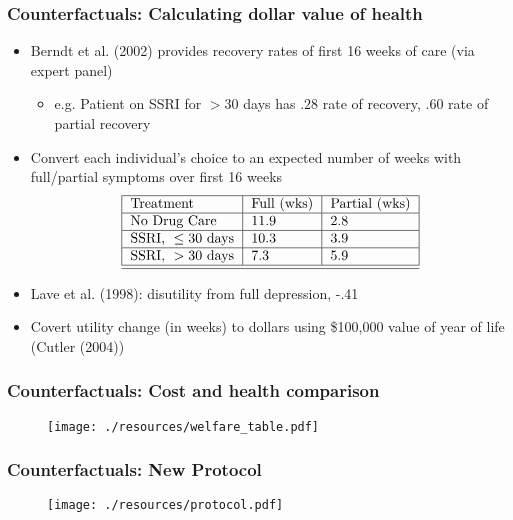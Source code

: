 \begin{frame}
\frametitle{Counterfactuals: Calculating dollar value of health}

\begin{itemize}
\item Berndt et al. (2002) provides recovery rates of first 16 weeks of care
(via expert panel)

\begin{itemize}
\item e.g. Patient on SSRI for $>30$ days has $.28$ rate of recovery, $.60$
rate of partial recovery
\end{itemize}

\item Convert each individual's choice to an expected number of weeks with
full/partial symptoms over first 16 weeks%
\[
\text{%
\begin{tabular}{|l|l|l|}
\hline
Treatment & Full (wks) & Partial (wks) \\ \hline
No Drug Care & $11.9$ & $2.8$ \\ \hline
$\text{SSRI, }\leq \text{30 days}$ & $10.3$ & $3.9$ \\ \hline
$\text{SSRI, }> \text{30 days}$ & $7.3$ & $5.9$ \\ \hline\hline
\end{tabular}%
} 
\]

\item Lave et al. (1998): disutility from full depression, -.41

\item Covert utility change (in weeks) to dollars using \$100,000 value of
year of life (Cutler (2004))
\end{itemize}
\end{frame}


\begin{frame}[label=WELFARE]

\frametitle{Counterfactuals: Cost and health comparison}

\begin{figure}[h!]
\centering\texttt{[image: ./resources/welfare\_table.pdf]}
\end{figure}
\end{frame}


\begin{frame}[plain]

\frametitle{Counterfactuals: New Protocol}

\begin{figure}[h!]
\centering\texttt{[image: ./resources/protocol.pdf]}
\end{figure}
\end{frame}

